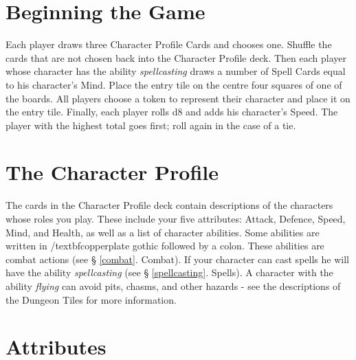 \documentclass{book}
\begin{document}
\section{Beginning the Game}
Each player draws three Character Profile Cards and chooses one. Shuffle the cards that are not chosen back into the Character Profile deck. Then each player whose character has the ability \emph{spellcasting} draws a number of Spell Cards equal to his character’s Mind. Place the entry tile on the centre four squares of one of the boards. All players choose a token to represent their character and place it on the entry tile. Finally, each player rolls d8 and adds his character’s Speed. The player with the highest total goes first; roll again in the case of a tie.  

\section{The Character Profile}

The cards in the Character Profile deck contain descriptions of the characters whose roles you play. These include your five attributes: Attack, Defence, Speed, Mind, and Health, as well as a list of character abilities.
Some abilities are written in /textbf{copperplate gothic} followed by a colon. These abilities are combat actions (see § \ref{combat}. Combat). If your character can cast spells he will have the ability \emph{spellcasting} (see § \ref{spellcasting}.  Spells).
A character with the ability \emph{flying} can avoid pits, chasms, and other hazards - see the descriptions of the Dungeon Tiles for more information.

\section{Attributes}
\end{document}
